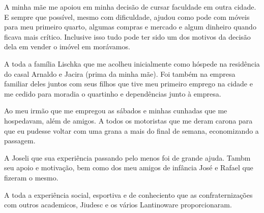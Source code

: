 
A minha mãe me apoiou em minha decisão de cursar faculdade em outra cidade. E
sempre que possível, mesmo com dificuldade, ajudou como pode com móveis para meu
primeiro quarto, algumas compras e mercado e algum dinheiro quando ficava mais
crítico. Inclusive isso tudo pode ter sido um dos motivos da decisão dela em
vender o imóvel em morávamos.

A toda a família Lischka que me acolheu inicialmente como hóspede na residência
do casal Arnaldo e Jacira (prima da minha mãe). Foi também na empresa familiar
deles juntos com seus filhos que tive meu primeiro emprego na cidade e me cedido
para moradia o quartinho e dependências junto à empresa.

Ao meu irmão que me empregou as sábados e minhas cunhadas que me hospedavam, além de amigos. A todos os motoristas que me deram carona para que eu pudesse voltar com uma grana a mais do final de semana, economizando a passagem.

A Joseli que sua experiência passando pelo menos foi de grande ajuda. Tambm seu apoio e motivação, bem como dos meu amigos de infância José e Rafael que fizeram o mesmo.

A toda a experiência social, esportiva e de conheciento que as confraternizações com outros academicos, Jiudesc e os vários Lantinoware proporcionaram.
